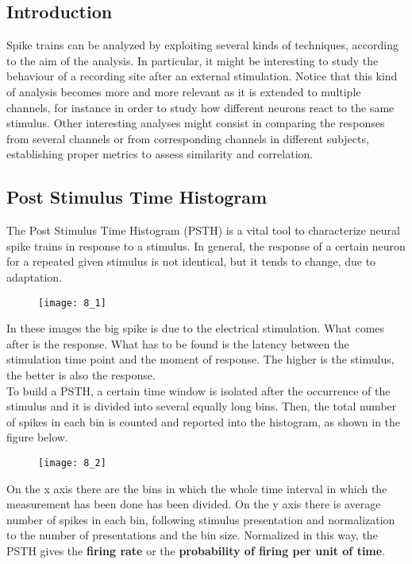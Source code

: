\subsection{Introduction}
Spike trains can be analyzed by exploiting several kinds of techniques, according
to the aim of the analysis. In particular, it might be interesting to study the
behaviour of a recording site after an external stimulation. Notice that this kind
of analysis becomes more and more relevant as it is extended to multiple channels, for
instance in order to study how different neurons react to the same stimulus. Other
interesting analyses might consist in comparing the responses from several channels or from corresponding channels in different subjects, establishing proper metrics to assess similarity
and correlation.

\subsection{Post Stimulus Time Histogram}
The Post Stimulus Time Histogram (PSTH) is a vital tool to characterize neural spike trains
in response to a stimulus. In general, the response of a certain neuron
for a repeated given stimulus is not identical, but it tends to change, due to adaptation.
\begin{figure}[H]
    \texttt{[image: 8\_1]}
    \centering
\end{figure}
In these images the big spike is due to the electrical stimulation. What comes after is the response. What has to be found is the latency between the stimulation time point and the moment of response. The higher is the stimulus, the better is also the response.\\
To build a PSTH, a certain time window is isolated after the occurrence of the stimulus and it is divided into several equally long bins. Then, the total number of spikes in each bin is counted and reported into the histogram, as shown in the figure below.
\begin{figure}[H]
    \texttt{[image: 8\_2]}
    \centering
\end{figure}
On the x axis there are the bins in which the whole time interval in which the measurement has been done has been divided. On the y axis there is average number of spikes in each bin, following stimulus presentation and normalization to the number of presentations and the bin size. Normalized in this way, the PSTH gives the \textbf{firing rate} or the \textbf{probability of firing per unit of time}.\\
